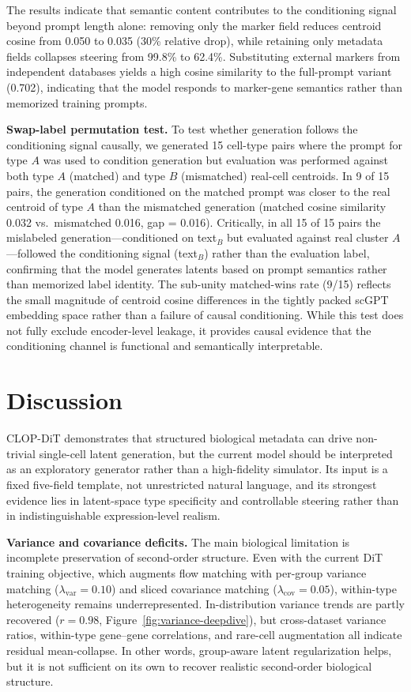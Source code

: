 \documentclass[fleqn,10pt,lineno]{wlpeerj}
\begin{document}
The results indicate that semantic content contributes to the conditioning signal beyond prompt length alone: removing only the marker field reduces centroid cosine from 0.050 to 0.035 (30\% relative drop), while retaining only metadata fields collapses steering from 99.8\% to 62.4\%. Substituting external markers from independent databases yields a high cosine similarity to the full-prompt variant (0.702), indicating that the model responds to marker-gene semantics rather than memorized training prompts.

\textbf{Swap-label permutation test.} To test whether generation follows the conditioning signal causally, we generated 15 cell-type pairs where the prompt for type $A$ was used to condition generation but evaluation was performed against both type $A$ (matched) and type $B$ (mismatched) real-cell centroids. In 9 of 15 pairs, the generation conditioned on the matched prompt was closer to the real centroid of type $A$ than the mismatched generation (matched cosine similarity 0.032 vs.\ mismatched 0.016, gap = 0.016). Critically, in all 15 of 15 pairs the mislabeled generation---conditioned on text$_B$ but evaluated against real cluster $A$---followed the conditioning signal (text$_B$) rather than the evaluation label, confirming that the model generates latents based on prompt semantics rather than memorized label identity. The sub-unity matched-wins rate (9/15) reflects the small magnitude of centroid cosine differences in the tightly packed scGPT embedding space rather than a failure of causal conditioning. While this test does not fully exclude encoder-level leakage, it provides causal evidence that the conditioning channel is functional and semantically interpretable.

\section*{Discussion}\label{sec:discussion}

CLOP-DiT demonstrates that structured biological metadata can drive non-trivial single-cell latent generation, but the current model should be interpreted as an exploratory generator rather than a high-fidelity simulator. Its input is a fixed five-field template, not unrestricted natural language, and its strongest evidence lies in latent-space type specificity and controllable steering rather than in indistinguishable expression-level realism.

\textbf{Variance and covariance deficits.} The main biological limitation is incomplete preservation of second-order structure. Even with the current DiT training objective, which augments flow matching with per-group variance matching ($\lambda_\text{var}=0.10$) and sliced covariance matching ($\lambda_\text{cov}=0.05$), within-type heterogeneity remains underrepresented. In-distribution variance trends are partly recovered ($r = 0.98$, Figure~\ref{fig:variance-deepdive}), but cross-dataset variance ratios, within-type gene--gene correlations, and rare-cell augmentation all indicate residual mean-collapse. In other words, group-aware latent regularization helps, but it is not sufficient on its own to recover realistic second-order biological structure.
\end{document}
